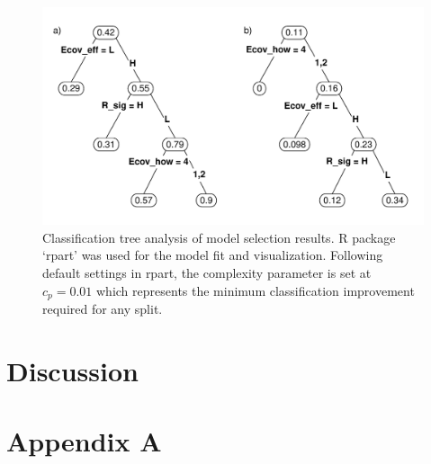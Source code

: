 \documentclass[11pt]{article}
\begin{document}
\begin{figure}[htb]
\begin{center}
\includegraphics[width = 5in]{reg_tree.pdf}
\caption{Classification tree analysis of model selection results. R package `rpart' was used for the model fit and visualization. Following default settings in rpart, the complexity parameter is set at $c_p=0.01$ which represents the minimum classification improvement required for any split.}
\end{center}
\end{figure}



\section*{Discussion}


\section*{Appendix A}






 
\end{document}
